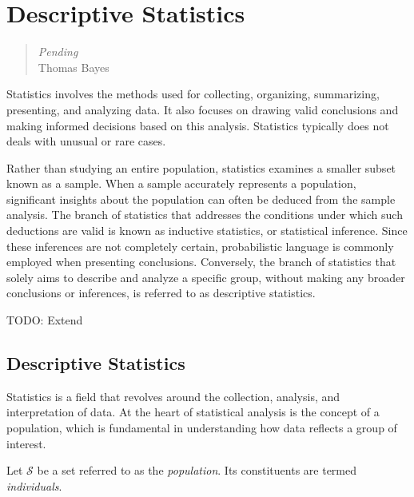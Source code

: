 %
%


\chapter{Descriptive Statistics}
\label{chap:descriptive_statistics}

\begin{quote}
\begin{flushright}
\emph{Pending}\\
Thomas Bayes
\end{flushright}
\end{quote}
\bigskip


Statistics involves the methods used for collecting, organizing, summarizing, presenting, and analyzing data. It also focuses on drawing valid conclusions and making informed decisions based on this analysis. Statistics typically does not deals with unusual or rare cases.

Rather than studying an entire population, statistics examines a smaller subset known as a sample. When a sample accurately represents a population, significant insights about the population can often be deduced from the sample analysis. The branch of statistics that addresses the conditions under which such deductions are valid is known as inductive statistics, or statistical inference. Since these inferences are not completely certain, probabilistic language is commonly employed when presenting conclusions. Conversely, the branch of statistics that solely aims to describe and analyze a specific group, without making any broader conclusions or inferences, is referred to as descriptive statistics.

{\color{red} TODO: Extend}

%
%

\section{Descriptive Statistics}

Statistics is a field that revolves around the collection, analysis, and interpretation of data. At the heart of statistical analysis is the concept of a population, which is fundamental in understanding how data reflects a group of interest. 

\begin{definition}
Let $\mathcal{S}$ be a set referred to as the \emph{population}. Its constituents are termed \emph{individuals}.
\end{definition}


